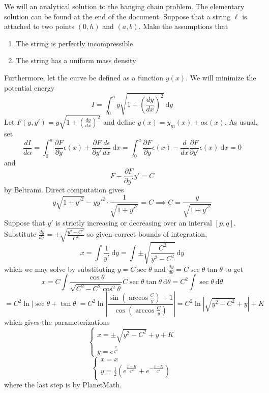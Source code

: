 \documentclass[11pt]{scrartcl}
\begin{document}
We will an analytical solution to the hanging chain problem. The elementary solution can be found at the end of the document. Suppose that a string $\ell$ is attached to two points $(0,h)$ and $(a,b)$. Make the assumptions that

\begin{enumerate}
    \item The string is perfectly incompressible
    \item The string has a uniform mass density
\end{enumerate}

Furthermore, let the curve be defined as a function $y(x)$. We will minimize the potential energy \[I = \int_0^a y \sqrt{1 + \left ( \frac{dy}{dx}\right )^2} \ \mathrm dy\] Let $F(y,y') = y \sqrt{1 + \left ( \frac{dy}{dx}\right )^2}$ and define $y(x) = y_m(x) + \alpha \epsilon(x)$. As usual, set \[\frac{dI}{d\alpha} = \int_0^a \frac{\partial F}{\partial y} \epsilon(x) + \frac{\partial F}{\partial y'} \frac{d\epsilon}{ dx} \ \mathrm dx = \int_0^a \frac{\partial F}{\partial y} \epsilon(x) - \frac{d}{dx} \frac{\partial F}{\partial y'} \epsilon(x) \ \mathrm dx = 0\] and \[F - \frac{\partial F}{\partial y'}y' = C\] by Beltrami. Direct computation gives \[y\sqrt{1 + y'^2} - yy'^2 \cdot \frac{1}{\sqrt{1 + y'^2}} = C \implies C = \frac{y}{\sqrt{1+y'^2}}\] Suppose that $y'$ is strictly increasing or decreasing over an interval $[p,q]$. Substitute $\frac{dy}{dx} = \pm \sqrt{\frac{y^2 - C^2}{C^2}}$ so given correct bounds of integration, \[x = \int \frac{1}{y'} \ \mathrm dy = \int \pm \sqrt{\frac{C^2}{y^2 - C^2}} \ \mathrm dy \] which we may solve by substituting $y =C \sec \theta$ and $\frac{dy}{d\theta} = C\sec\theta \tan\theta$ to get \[x = C\int \frac{\cos\theta}{\sqrt{C^2 - C^2\cos^2\theta}} C\sec\theta \tan\theta \ \mathrm d\theta = C^2 \int \sec\theta \ \mathrm d\theta \] \[ = C^2 \ln |\sec\theta +\tan\theta| = C^2 \ln \left |\frac{\sin\left (\arccos \frac{C}{y} \right )+1}{\cos \left (\arccos \frac{C}{y} \right )}\right | = C^2 \ln |\sqrt{y^2-C^2} + y| + K \] which gives the parameterizations \[\begin{cases}
    x = \pm\sqrt{y^2-C^2}+y + K\\ y = e^{\frac{x}{C^2}} 
\end{cases}\] \[\begin{cases}
    x = x \\ y = \frac{1}{2}\left (e^{\frac{x-K}{C^2}} + e^{-\frac{x-K}{C^2}}\right )
\end{cases}\] where the last step is by PlanetMath. 
\end{document}

